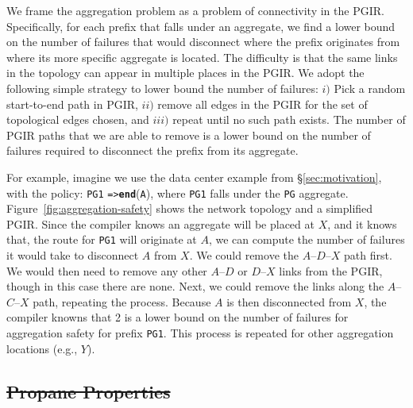 \documentclass{sig-alternate-10pt}
\newcommand{\sysname}{{\small \sf Propane}\xspace}
\newcommand{\CD}[1]{\texttt{\small #1}}  %
\newcommand{\KW}[1]{\texttt{\small\bfseries{#1}}}
\newcommand{\Path}{\texttt{=>}}
\newcommand{\End}{\KW{end}}
\providecommand{\DIFdel}[1]{{\protect\color{red}\sout{#1}}}                      %
\providecommand{\DIFdelbegin}{} %
\providecommand{\DIFdelend}{} %
\begin{document}
We frame the aggregation problem as a problem of connectivity in the PGIR. Specifically, for each prefix that falls under an aggregate, we find a lower bound on the number of failures that would disconnect where the prefix originates from where its more specific aggregate is located. The difficulty is that the same links in the topology can appear in multiple places in the PGIR. We adopt the following simple strategy to lower bound the number of failures: $i)$ Pick a random start-to-end path in PGIR, $ii)$ remove all edges in the PGIR for the set of topological edges chosen, and $iii)$ repeat until no such path exists.
The number of PGIR paths that we are able to remove is a lower bound on the number of failures required to disconnect the prefix from its aggregate. 

For example, imagine we use the data center example from \S\ref{sec:motivation}, with the policy: 
\CD{PG1} \Path \text{ }\End(\CD{A}), where \CD{PG1} falls under the \CD{PG} aggregate. Figure~\ref{fig:aggregation-safety} shows the network topology and a simplified PGIR. Since the compiler knows an aggregate will be placed at $X$, and it knows that, the route for \CD{PG1} will originate at $A$, we can compute the number of failures it would take to disconnect $A$ from $X$. We could remove the $A$--$D$--$X$ path first. We would then need to remove any other $A$--$D$ or $D$--$X$ links from the PGIR, though in this case there are none. Next, we could remove the links along the $A$--$C$--$X$ path, repeating the process. Because $A$ is then disconnected from $X$, the compiler knowns that 2 is a lower bound on the number of failures for aggregation safety for prefix \CD{PG1}. This process is repeated for other aggregation locations (e.g., $Y$).


\DIFdelbegin \subsection{\DIFdel{Propane Properties}}
\addtocounter{subsection}{-1}%


\DIFdelend %
\DIFdelbegin %
\end{document}
